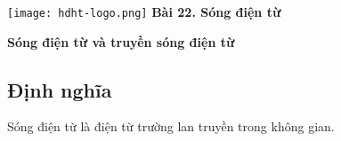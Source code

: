\newcommand{\chapter}[2][]{
	\newcommand{\chapname}{#2}
	\begin{flushleft}
		\begin{minipage}[t]{\linewidth}
			\texttt{[image: hdht-logo.png]}
			\hspace{0pt}	
			\sffamily\bfseries\large Bài  22. Sóng điện từ
			\begin{flushleft}
				\huge\bfseries #1
			\end{flushleft}
		\end{minipage}
	\end{flushleft}
	\vspace{1cm}
	\normalfont\normalsize
}
\chapter[Sóng điện từ và truyền sóng điện từ]{Sóng điện từ và truyền sóng điện từ}

\subsection{Định nghĩa}
Sóng điện từ là điện từ trường lan truyền trong không gian.
